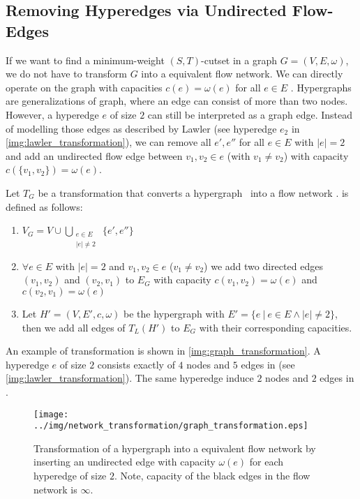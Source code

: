\subsection{Removing Hyperedges via Undirected Flow-Edges}
\label{sec:edge_size_network}

If we want to find a minimum-weight $(S,T)$-cutset in a graph $G = (V,E,\omega)$, we do not have to transform
$G$ into a equivalent flow network. We can directly operate on the graph with capacities
$c(e) = \omega(e)$ for all $e \in E$ \cite{ford1956maximal}. Hypergraphs are generalizations of graph, where
an edge can consist of more than two nodes. However, a hyperedge $e$ of size $2$ can still be 
interpreted as a graph edge. Instead of modelling those edges as described by Lawler \cite{lawler1973}
(see hyperedge $e_2$ in \autoref{img:lawler_transformation}), we can remove all $e',e''$ for all $e \in E$
with $|e| = 2$ and add an undirected flow edge between $v_1,v_2 \in e$ (with $v_1 \neq v_2$) with
capacity $c(\{v_1,v_2\}) = \omega(e)$.

\begin{definition}
Let $T_G$ be a transformation that converts a hypergraph \HypergraphDef~into 
a flow network .  is defined as follows:
\begin{enumerate}
\item $V_G = V \cup \bigcup\limits_{\substack{e \in E \\ |e| \neq 2}}\ \{e', e''\}$
\item $\forall e \in E$ with $|e| = 2$ and $v_1,v_2 \in e$ ($v_1 \neq v_2$) we add 
      two directed edges $(v_1,v_2)$ and $(v_2,v_1)$ to $E_G$ with capacity $c(v_1,v_2) = \omega(e)$
      and $c(v_2,v_1) = \omega(e)$
\item Let $H' = (V,E',c,\omega)$ be the hypergraph with $E' = \{e\ |\ e \in E \land |e| \neq 2\}$,
      then we add all edges of $T_L(H')$ to $E_G$ with their corresponding capacities.
\end{enumerate} 
\end{definition}

An example of transformation  is shown in \autoref{img:graph_transformation}. A hyperedge
$e$ of size $2$ consists exactly of $4$ nodes and $5$ edges in  (see \autoref{img:lawler_transformation}).
The same hyperedge induce $2$ nodes and $2$ edges in . 
 
\begin{figure}
\centering
\texttt{[image: ../img/network\_transformation/graph\_transformation.eps]}
\caption{Transformation of a hypergraph into a equivalent flow network by inserting 
         an undirected edge with capacity $\omega(e)$ for each hyperedge of size $2$. 
         Note, capacity of the black edges in the flow network is $\infty$.}
\label{img:graph_transformation}
\end{figure}

